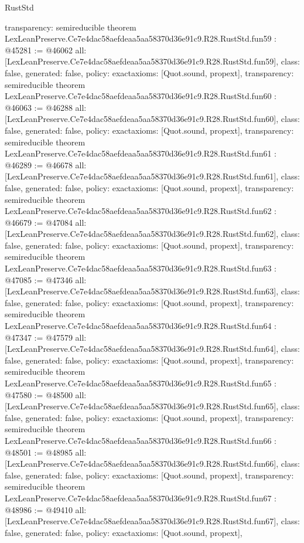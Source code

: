 \begin{lexlean}{RustStd}
\begin{coremodule}
{  transparency: semireducible
}
theorem LexLeanPreserve.Ce7e4dac58aefdeaa5aa58370d36e91c9.R28.RustStd.fun59 : @45281 := @46062 {
  all: [LexLeanPreserve.Ce7e4dac58aefdeaa5aa58370d36e91c9.R28.RustStd.fun59],
  class: false,
  generated: false,
  policy: exact{axioms: [Quot.sound, propext]},
  transparency: semireducible
}
theorem LexLeanPreserve.Ce7e4dac58aefdeaa5aa58370d36e91c9.R28.RustStd.fun60 : @46063 := @46288 {
  all: [LexLeanPreserve.Ce7e4dac58aefdeaa5aa58370d36e91c9.R28.RustStd.fun60],
  class: false,
  generated: false,
  policy: exact{axioms: [Quot.sound, propext]},
  transparency: semireducible
}
theorem LexLeanPreserve.Ce7e4dac58aefdeaa5aa58370d36e91c9.R28.RustStd.fun61 : @46289 := @46678 {
  all: [LexLeanPreserve.Ce7e4dac58aefdeaa5aa58370d36e91c9.R28.RustStd.fun61],
  class: false,
  generated: false,
  policy: exact{axioms: [Quot.sound, propext]},
  transparency: semireducible
}
theorem LexLeanPreserve.Ce7e4dac58aefdeaa5aa58370d36e91c9.R28.RustStd.fun62 : @46679 := @47084 {
  all: [LexLeanPreserve.Ce7e4dac58aefdeaa5aa58370d36e91c9.R28.RustStd.fun62],
  class: false,
  generated: false,
  policy: exact{axioms: [Quot.sound, propext]},
  transparency: semireducible
}
theorem LexLeanPreserve.Ce7e4dac58aefdeaa5aa58370d36e91c9.R28.RustStd.fun63 : @47085 := @47346 {
  all: [LexLeanPreserve.Ce7e4dac58aefdeaa5aa58370d36e91c9.R28.RustStd.fun63],
  class: false,
  generated: false,
  policy: exact{axioms: [Quot.sound, propext]},
  transparency: semireducible
}
theorem LexLeanPreserve.Ce7e4dac58aefdeaa5aa58370d36e91c9.R28.RustStd.fun64 : @47347 := @47579 {
  all: [LexLeanPreserve.Ce7e4dac58aefdeaa5aa58370d36e91c9.R28.RustStd.fun64],
  class: false,
  generated: false,
  policy: exact{axioms: [Quot.sound, propext]},
  transparency: semireducible
}
theorem LexLeanPreserve.Ce7e4dac58aefdeaa5aa58370d36e91c9.R28.RustStd.fun65 : @47580 := @48500 {
  all: [LexLeanPreserve.Ce7e4dac58aefdeaa5aa58370d36e91c9.R28.RustStd.fun65],
  class: false,
  generated: false,
  policy: exact{axioms: [Quot.sound, propext]},
  transparency: semireducible
}
theorem LexLeanPreserve.Ce7e4dac58aefdeaa5aa58370d36e91c9.R28.RustStd.fun66 : @48501 := @48985 {
  all: [LexLeanPreserve.Ce7e4dac58aefdeaa5aa58370d36e91c9.R28.RustStd.fun66],
  class: false,
  generated: false,
  policy: exact{axioms: [Quot.sound, propext]},
  transparency: semireducible
}
theorem LexLeanPreserve.Ce7e4dac58aefdeaa5aa58370d36e91c9.R28.RustStd.fun67 : @48986 := @49410 {
  all: [LexLeanPreserve.Ce7e4dac58aefdeaa5aa58370d36e91c9.R28.RustStd.fun67],
  class: false,
  generated: false,
  policy: exact{axioms: [Quot.sound, propext]},
}
\end{coremodule}
\end{lexlean}
